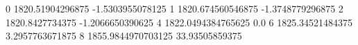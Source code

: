 0 1820.51904296875 -1.5303955078125
1 1820.674560546875 -1.3748779296875
2 1820.8427734375 -1.2066650390625
4 1822.0494384765625 0.0
6 1825.34521484375 3.2957763671875
8 1855.9844970703125 33.93505859375
